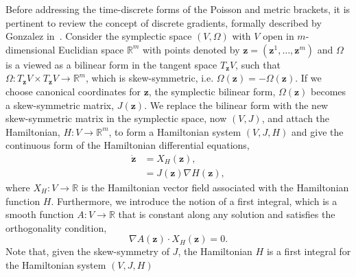 \documentclass[preprint,12pt]{elsarticle}
\theoremstyle{definition}
\begin{document}
Before addressing the time-discrete forms of the Poisson and metric brackets, it is pertinent to review the concept of discrete gradients, formally described by Gonzalez in~\cite{Gonzalez1996}. 
Consider the symplectic space $\left( V ,  \Omega \right)$ with $V$ open in $m$-dimensional Euclidian space $\mathbb{R}^m$ with points denoted by $\boldsymbol{z} = \left( \boldsymbol{z}^1, \ldots, \boldsymbol{z}^m \right)$ and $\Omega $ is a viewed as a bilinear form in the tangent space $T_{\boldsymbol{z}} V$, such that $\Omega : T_{\boldsymbol{z}} V \times T_{\boldsymbol{z}} V \rightarrow \mathbb{R}^m$, which is skew-symmetric, i.e. $\Omega (\boldsymbol{z}) = - \Omega(\boldsymbol{z})$. If we choose canonical coordinates for $\boldsymbol{z}$, the symplectic bilinear form, $\Omega(\boldsymbol{z})$ becomes a skew-symmetric matrix, $J(\boldsymbol{z})$. We replace the bilinear form with the new skew-symmetric matrix in the symplectic space, now $\left(V,J\right)$, and attach the Hamiltonian, $H:V\rightarrow \mathbb{R}^m$, to form a Hamiltonian system $(V,J,H)$ and give the continuous form of the Hamiltonian differential equations,
\begin{align}
 \dot{\boldsymbol{z}} &= X_H \left( \boldsymbol{z} \right), \label{HDE} \\
 &= J(\boldsymbol{z}) \nabla H(\boldsymbol{z}), \nonumber
\end{align}
where $X_H : V \rightarrow \mathbb{R} $ is the Hamiltonian vector field associated with the Hamiltonian function $H$.
Furthermore, we introduce the notion of a first integral, which is a smooth function $A: V \rightarrow \mathbb{R}$ that is constant along any solution and satisfies the orthogonality condition,
\begin{equation}
\nabla A(\boldsymbol{z}) \cdot X_H(\boldsymbol{z}) = 0.
\end{equation}
Note that, given the skew-symmetry of $J$, the Hamiltonian $H$ is a first integral for the Hamiltonian system $(V,J,H)$
\end{document}
